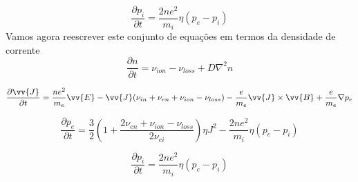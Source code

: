\documentclass[12pt,oneside,a4paper]{abntex2}
\begin{document}
\begin{equation}
\frac{\partial p_i}{\partial t} = \frac{2ne^2}{m_i}\eta(p_e-p_i)
\end{equation}
Vamos agora reescrever este conjunto de equações em termos da densidade de corrente
\begin{equation}
\frac{\partial n}{\partial t} = \nu_{ion} - \nu_{loss}+D\nabla^2n
\end{equation}

\begin{equation}
\frac{\partial \vv{J}}{\partial t} =  \frac{ne^2}{m_e} \vv{E} -\vv{J}(\nu_{in}+\nu_{en}+\nu_{ion}-\nu_{loss}) -\frac{e}{m_e}\vv{J} \times \vv{B}+\frac{e}{m_e}\nabla p_e 
\end{equation}

\begin{equation}
\frac{\partial p_e}{\partial t} = \frac{3}{2}(1+\frac{2 \nu_{en} + \nu_{ion} - \nu_{loss}}{2\nu_{ei}})\eta J^2  -\frac{2ne^2}{m_i} \eta (p_e-p_i)
\end{equation}

\begin{equation}
\frac{\partial p_i}{\partial t} = \frac{2ne^2}{m_i}\eta(p_e-p_i)
\end{equation}
\end{document}
